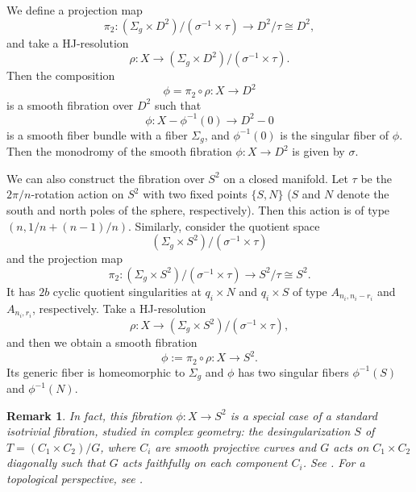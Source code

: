 \documentclass[10pt,a4paper,reqno]{amsart}
\newtheorem{rmk}[thm]{Remark}
\theoremstyle{definition}
\numberwithin{equation}{section}
\numberwithin{figure}{section}
\newcommand{\arrowr}{\rightarrow}
\begin{document}
We define a projection map \[\pi_2: (\Sigma_g \times D^2)/(\sigma^{-1}\times \tau) \arrowr D^2/\tau \cong D^2,\] 
and take a HJ-resolution \[\rho: X \arrowr (\Sigma_g \times D^2)/(\sigma^{-1}\times \tau).\]  
Then the composition \[\phi=\pi_2 \circ \rho: X \arrowr D^2\] is a smooth fibration over $D^2$ such that 
\[\phi: X-\phi^{-1}(0) \arrowr D^2-0\] is a smooth fiber bundle with a fiber $\Sigma_g$, 
and $\phi^{-1}(0)$ is the singular fiber of $\phi$.
Then the monodromy of the smooth fibration $\phi: X \arrowr D^2$ is given by $\sigma$.


%

We can also construct the fibration over $S^2$ on a closed manifold.
Let $\tau$ be the $2\pi /n$-rotation action on $S^2$ with two fixed points $\{S,N\}$ ($S$ and $N$ denote the south and north poles of the sphere, respectively).
Then this action is of type $(n,1/n+(n-1)/n)$.
Similarly, consider the quotient space \[(\Sigma_g \times S^2)/(\sigma^{-1} \times \tau)\] and the projection map 
\[\pi_2: (\Sigma_g \times S^2)/(\sigma^{-1} \times \tau) \arrowr S^2/\tau \cong S^2.\]
It has $2b$ cyclic quotient singularities at $q_i\times N$ and $q_i\times S$ of type $A_{n_i, n_i-r_i}$ and $A_{n_i, r_i}$, respectively.
Take a HJ-resolution \[\rho: X \arrowr (\Sigma_g \times S^2)/(\sigma^{-1} \times \tau),\] 
and then we obtain a smooth fibration \[\phi:=\pi_2 \circ \rho: X \arrowr S^2.\]
Its generic fiber is homeomorphic to $\Sigma_g$ and $\phi$ has two singular fibers $\phi^{-1}(S)$ and $\phi^{-1}(N)$.

\begin{rmk}
In fact, this fibration $\phi: X \arrowr S^2$ is a special case of a standard isotrivial fibration, studied in complex geometry:
the desingularization $S$ of $T=(C_1\times C_2)/G$, where $C_i$ are smooth projective curves and $G$ acts on $C_1\times C_2$ diagonally such that $G$ acts faithfully on each component $C_i$.
See \cite{Se}. For a topological perspective, see \cite{P}. 
\end{rmk}
\end{document}
